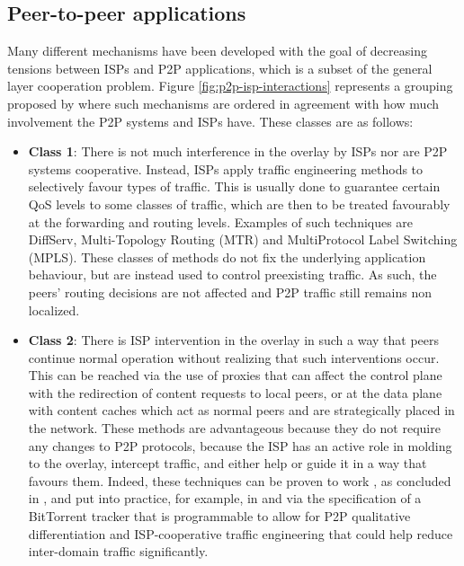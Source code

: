         \subsection{Peer-to-peer applications}

        Many different mechanisms have been developed with the goal of decreasing tensions between ISPs and P2P applications, which is a subset of the general layer cooperation problem.
        Figure \ref{fig:p2p-isp-interactions} represents a grouping proposed by \cite{dan-Commag10} where such mechanisms are ordered in agreement with how much involvement the P2P systems and ISPs have. These classes are as follows:

    \begin{itemize}
        \item \textbf{Class 1}:
            There is not much interference in the overlay by ISPs nor are P2P systems cooperative.
            Instead, ISPs apply traffic engineering methods to selectively favour types of traffic.
            This is usually done to guarantee certain QoS levels to some classes of traffic, which are then to be treated favourably at the forwarding and routing levels.
            Examples of such techniques are DiffServ, Multi-Topology Routing (MTR) and MultiProtocol Label Switching (MPLS).
            These classes of methods do not fix the underlying application behaviour, but are instead used to control preexisting traffic.
            As such, the peers' routing decisions are not affected and P2P traffic still remains non localized.
        \item \textbf{Class 2}:
            There is ISP intervention in the overlay in such a way that peers continue normal operation without realizing that such interventions occur.
            This can be reached via the use of proxies that can affect the control plane with the redirection of content requests to local peers, or at the data plane with content caches which act as normal peers and are strategically placed in the network.
            These methods are advantageous because they do not require any changes to P2P protocols, because the ISP has an active role in molding to the overlay, intercept traffic, and either help or guide it in a way that favours them.
            Indeed, these techniques can be proven to work , as concluded in \cite{dan-Commag10}, and put into practice, for example, in \cite{programmable-trackers} and \cite{configurable-trackers} via the specification of a BitTorrent tracker that is programmable to allow for P2P qualitative differentiation and ISP-cooperative traffic engineering that could help reduce inter-domain traffic significantly.

\end{itemize}
